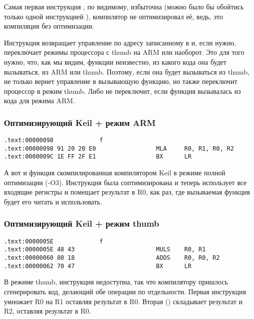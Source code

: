 Самая первая инструкция , по видимому, избыточна (можно было бы обойтись только одной инструкцией 
), компилятор не оптимизировал её, ведь, это компиляция без оптимизации.

Инструкция  возвращает управление по адресу записанному в \LR и, если нужно, переключает режимы процессора
с thumb на ARM или наоборот. Это для того нужно, что, как мы видим, функции  неизвестно, из какого кода
она будет вызываться, из ARM или thumb. Поэтому, если она будет вызываться из thumb,  не только вернет
управление в вызывающую функцию, но также переключит процессор в режим thumb. Либо не переключит, если функция
вызывалась из кода для режима ARM.

\subsubsection{Оптимизирующий Keil + режим ARM}

\begin{lstlisting}
.text:00000098             f
.text:00000098 91 20 20 E0                 MLA     R0, R1, R0, R2
.text:0000009C 1E FF 2F E1                 BX      LR
\end{lstlisting}

А вот и функция  скомпилированная компилятором Keil в режиме полной оптимизации (-O3). Инструкция \MOV была
соптимизирована и теперь  использует все входящие регистры и помещает результат в R0, как раз, где
вызываемая функция будет его читать и использовать.

\subsubsection{Оптимизирующий Keil + режим thumb}

\begin{lstlisting}
.text:0000005E             f
.text:0000005E 48 43                       MULS    R0, R1
.text:00000060 80 18                       ADDS    R0, R0, R2
.text:00000062 70 47                       BX      LR
\end{lstlisting}

В режиме thumb, инструкция  недоступна, так что компилятору пришлось сгенерировать код, делающий
обе операции по отдельности. Первая инструкция  умножает R0 на R1 оставляя результат в R0. 
Вторая () складывает результат и R2, оставляя результат в R0.

